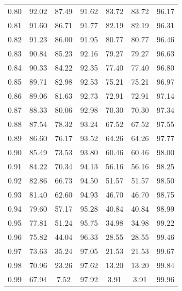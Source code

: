 \begin{tabular}{|c|c|c|c|c|c|c|}
      0.80 &     92.02 &     87.49 &      91.62 &   83.72 &      83.72 &         96.17 \\
      0.81 &     91.60 &     86.71 &      91.77 &   82.19 &      82.19 &         96.31 \\
      0.82 &     91.23 &     86.00 &      91.95 &   80.77 &      80.77 &         96.46 \\
      0.83 &     90.84 &     85.23 &      92.16 &   79.27 &      79.27 &         96.63 \\
      0.84 &     90.33 &     84.22 &      92.35 &   77.40 &      77.40 &         96.80 \\
      0.85 &     89.71 &     82.98 &      92.53 &   75.21 &      75.21 &         96.97 \\
      0.86 &     89.06 &     81.63 &      92.73 &   72.91 &      72.91 &         97.14 \\
      0.87 &     88.33 &     80.06 &      92.98 &   70.30 &      70.30 &         97.34 \\
      0.88 &     87.54 &     78.32 &      93.24 &   67.52 &      67.52 &         97.55 \\
      0.89 &     86.60 &     76.17 &      93.52 &   64.26 &      64.26 &         97.77 \\
      0.90 &     85.49 &     73.53 &      93.80 &   60.46 &      60.46 &         98.00 \\
      0.91 &     84.22 &     70.34 &      94.13 &   56.16 &      56.16 &         98.25 \\
      0.92 &     82.86 &     66.73 &      94.50 &   51.57 &      51.57 &         98.50 \\
      0.93 &     81.40 &     62.60 &      94.93 &   46.70 &      46.70 &         98.75 \\
      0.94 &     79.60 &     57.17 &      95.28 &   40.84 &      40.84 &         98.99 \\
      0.95 &     77.81 &     51.24 &      95.75 &   34.98 &      34.98 &         99.22 \\
      0.96 &     75.82 &     44.04 &      96.33 &   28.55 &      28.55 &         99.46 \\
      0.97 &     73.63 &     35.24 &      97.05 &   21.53 &      21.53 &         99.67 \\
      0.98 &     70.96 &     23.26 &      97.62 &   13.20 &      13.20 &         99.84 \\
      0.99 &     67.94 &      7.52 &      97.92 &    3.91 &       3.91 &         99.96 \\
\bottomrule
\end{tabular}

